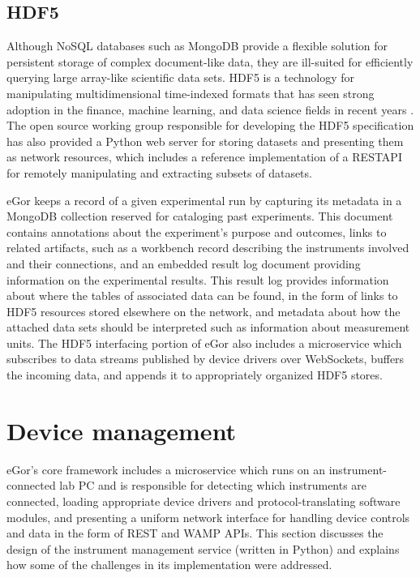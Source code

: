 \documentclass[../thesis]{subfiles}
\begin{document}
\subsection{HDF5}
Although NoSQL databases such as MongoDB provide a flexible solution
for persistent storage of complex document-like data, they are
ill-suited for efficiently querying large array-like scientific data
sets. HDF5 is a technology for manipulating multidimensional
time-indexed formats that has seen strong adoption in the finance, machine
learning, and data science fields in recent years \cite{HDF5}. The
open source working group responsible for developing the HDF5
specification has also provided a Python web server for storing
datasets and presenting them as network resources, which includes a
reference implementation of a \gls{RESTAPI} for remotely manipulating
and extracting subsets of datasets.

eGor keeps a record of a given experimental run by capturing its
metadata in a MongoDB collection reserved for cataloging past
experiments. This document contains annotations about the experiment's
purpose and outcomes, links to related artifacts, such as a workbench
record describing the instruments involved and their connections, and
an embedded result log document providing information on the
experimental results. This result log provides information about where
the tables of associated data can be found, in the form of links to
HDF5 resources stored elsewhere on the network, and metadata about how
the attached data sets should be interpreted such as information about
measurement units. The HDF5 interfacing portion of eGor also includes
a microservice which subscribes to data streams published by device
drivers over WebSockets, buffers the incoming data, and appends it to
appropriately organized HDF5 stores.



\section{Device management}
eGor's core framework includes a microservice which runs on an
instrument-connected lab PC and is responsible for detecting which
instruments are connected, loading appropriate device drivers and
protocol-translating software modules, and presenting a uniform
network interface for handling device controls and data in the form
of \gls{REST} and \gls{WAMP} \glspl{API}. This section discusses the
design of the instrument management service (written in Python) and
explains how some of the challenges in its implementation were
addressed.
\end{document}
